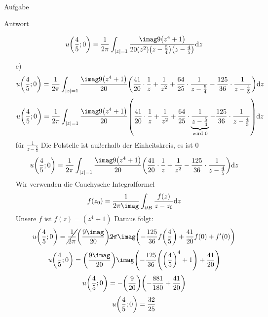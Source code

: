 \documentclass{scrartcl}
\begin{document}
\begin{section}{Aufgabe}
\begin{subsection}{Antwort}
\begin{itemize}
 \[u\qty(\frac{4}{5};0)=\frac{1}{2\pi}\int_{\qty|z|=1}\frac{\imag 9\qty(z^4+1)}{20 \qty(z^2)\qty(z-\frac{5}{4})\qty(z-\frac{4}{5})} \dd z \]
\item[e)] 
\[u\qty(\frac{4}{5};0)=\frac{1}{2\pi}\int_{\qty|z|=1}\frac{\imag 9\qty(z^4+1)}{20}\qty(\frac{41}{20} \cdot \frac{1}{z}+\frac{1}{z^{2}}+\frac{64}{25} \cdot \frac{1}{z-\frac{5}{4}}-\frac{125}{36} \cdot \frac{1}{z-\frac{4}{5}})  \dd z \]
 \[u\qty(\frac{4}{5};0)=\frac{1}{2\pi}\int_{\qty|z|=1}\frac{\imag 9\qty(z^4+1)}{20}\qty(\frac{41}{20} \cdot \frac{1}{z}+\frac{1}{z^{2}}+\frac{64}{25} \cdot \underbrace{\frac{1}{z-\frac{5}{4}}}_{\text{wird $0$}}-\frac{125}{36} \cdot \frac{1}{z-\frac{4}{5}})  \dd z \]
für $\frac{1}{z-\frac{5}{4}}$ Die Polstelle ist außerhalb der Einheitskreis, es ist $0$
 \[u\qty(\frac{4}{5};0)=\frac{1}{2\pi}\int_{\qty|z|=1}\frac{\imag 9\qty(z^4+1)}{20}\qty(\frac{41}{20} \cdot \frac{1}{z}+\frac{1}{z^{2}}-\frac{125}{36} \cdot \frac{1}{z-\frac{4}{5}})  \dd z \]
Wir verwenden die Cauchysche Integralformel
\[f(z_0)=\frac{1}{2\pi \imag} \int_{\partial B}\frac{f(z)}{z-z_0}\dd z\]
Unsere $f$ ist $f(z)=(z^4+1)$
Daraus folgt:
 \[u\qty(\frac{4}{5};0)=\cancel{\frac{1}{2\pi}} \qty(\frac{9 \imag}{20}) \cancel{2\pi} \imag \qty(-\frac{125}{36}f\qty(\frac{4}{5})+\frac{41}{20}f(0)+f'(0)) \]
 \[u\qty(\frac{4}{5};0)= \qty(\frac{9 \imag}{20}) \imag \qty(-\frac{125}{36}\qty(\qty(\frac{4}{5})^4+1)+\frac{41}{20}) \]
 \[u\qty(\frac{4}{5};0)=- \qty(\frac{9}{20})  \qty(-\frac{881}{180}+\frac{41}{20}) \]
 \[u\qty(\frac{4}{5};0)=\frac{32}{25} \]

\end{itemize}
    \end{subsection}  
\end{section}
\end{document}
